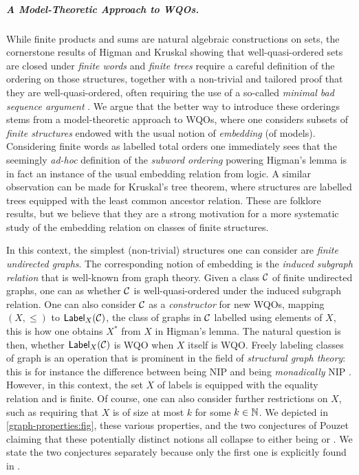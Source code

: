\subparagraph{A Model-Theoretic Approach to WQOs.}
\AP 
While finite products and sums are natural algebraic constructions on sets, the
cornerstone results of Higman and Kruskal showing that well-quasi-ordered sets
are closed under \emph{finite words} \cite{HIG52} and \emph{finite trees}
\cite{KRU72} require a careful definition of the ordering on those structures,
together with a non-trivial and tailored proof that they are
well-quasi-ordered, often requiring the use of a so-called \emph{minimal bad
sequence argument} \cite{NASH65}. We argue that the better way to introduce
these orderings stems from a model-theoretic approach to WQOs, where one
considers subsets of \emph{finite structures} endowed with the usual notion of
\emph{embedding} (of models). Considering finite words as labelled total orders
one immediately sees that the seemingly \emph{ad-hoc} definition of the
\emph{subword ordering} powering Higman's lemma is in fact an instance of the
usual embedding relation from logic. A similar observation can be made for
Kruskal's tree theorem, where structures are labelled trees equipped with the
least common ancestor relation. These are folklore results, but we believe that
they are a strong motivation for a more systematic study of the embedding
relation on classes of finite structures.

\AP In this context, the simplest (non-trivial) structures one can consider are
\emph{finite undirected graphs}. The corresponding notion of embedding is the
\emph{induced subgraph relation} that is well-known from graph theory. Given a
class $\mathcal{C}$ of finite undirected graphs, one can as whether $\mathcal{C}$ is
well-quasi-ordered under the induced subgraph relation. One can also consider
$\mathcal{C}$ as a \emph{constructor} for new WQOs, mapping $(X, \leq)$ to
$\mathsf{Label}_{X}(\mathcal{C})$, the class of graphs in $\mathcal{C}$ labelled using elements of
$X$, this is how one obtains $X^*$ from $X$ in Higman's lemma. The natural
question is then, whether $\mathsf{Label}_{X}(\mathcal{C})$ is WQO when $X$ itself is WQO.
Freely labeling classes of graph is an operation that is prominent in the field
of \emph{structural graph theory}: this is for instance the difference between
being NIP and being \emph{monadically} NIP . However, in this
context,  the set $X$ of labels is equipped with the equality relation and is
finite. Of course, one can also consider further restrictions on $X$, such as
requiring that $X$ is of size at most $k$ for some $k \in \mathbb{N}$. We  depicted
in
\cref{graph-properties:fig},
these various properties, and the two conjectures of Pouzet claiming that these
potentially distinct notions all collapse to either being  or
. We state the two conjectures separately because only the first
one is explicitly found in \cite{POUZ72}.

